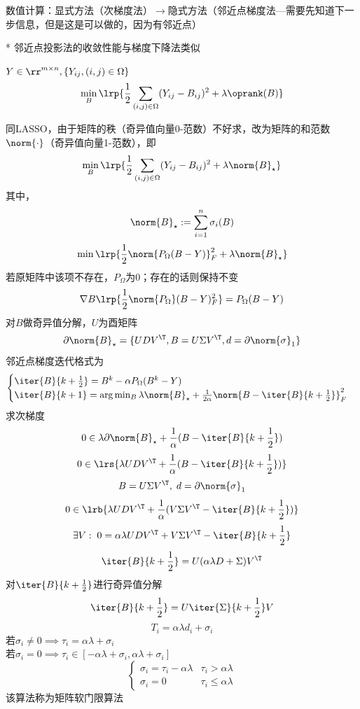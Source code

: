 数值计算：显式方法（次梯度法）$\to$隐式方法（邻近点梯度法---需要先知道下一步信息，但是这是可以做的，因为有邻近点）

* 邻近点投影法的收敛性能与梯度下降法类似

\begin{example}[矩阵补全]
    $Y\in\rr^{m\times n},\{Y_{ij},(i,j)\in\Omega\}$
    \[\min_B\lrp{\frac{1}{2}\sum_{(i,j)\in\Omega}(Y_{ij}-B_{ij})^2+\lambda\oprank(B)}\]
\end{example}
\begin{analysis}
    同LASSO，由于矩阵的秩（奇异值向量0-范数）不好求，改为矩阵的和范数$\norm{\cdot}$（奇异值向量1-范数），即
    \[\min_B\lrp{\frac{1}{2}\sum_{(i,j)\in\Omega}(Y_{ij}-B_{ij})^2+\lambda\norm{B}_\star}\]
    其中，
    \[\norm{B}_\star:=\sum_{i=1}^n\sigma_i(B)\]
    \[\min\lrp{\frac{1}{2}\norm{P_\Omega(B-Y)}_F^2+\lambda\norm{B}_\star}\]
    若原矩阵中该项不存在，$P_\Omega$为$0$；存在的话则保持不变
    \[\nabla B\lrp{\frac{1}{2}\norm{P_\Omega}(B-Y)_F^2}=P_\Omega(B-Y)\]
    对$B$做奇异值分解，$U$为酉矩阵
    \[\partial\norm{B}_\star=\{UDV^\T, B=U\Sigma V^\T, d=\partial\norm{\sigma}_1\}\]
    邻近点梯度迭代格式为
    \[\begin{cases}
        \iter{B}{k+\frac{1}{2}}=B^k-\alpha P_\Omega(B^k-Y)\\
        \iter{B}{k+1}=\arg\min_B\lambda\norm{B}_\star+\frac{1}{2\alpha}\norm{B-\iter{B}{k+\frac{1}{2}}}_F^2
    \end{cases}\]
    求次梯度
    \[0\in\lambda\partial\norm{B}_\star+\frac{1}{\alpha}(B-\iter{B}{k+\frac{1}{2}})\]
    \[0\in\lrs{\lambda UDV^\T+\frac{1}{\alpha}(B-\iter{B}{k+\frac{1}{2}})}\]
    \[B=U\Sigma V^\T,\;d=\partial\norm{\sigma}_1\]
    \[0\in\lrb{\lambda UDV^\T +\frac{1}{\alpha}(V\Sigma V^\T-\iter{B}{k+\frac{1}{2}})}\]
    \[\exists V:\;0=\alpha\lambda UDV^\T+V\Sigma V^\T-\iter{B}{k+\frac{1}{2}}\]
    \[\iter{B}{k+\frac{1}{2}}=U(\alpha\lambda D+\Sigma)V^\T\]
    对$\iter{B}{k+\frac{1}{2}}$进行奇异值分解
    \[\iter{B}{k+\frac{1}{2}}=U\iter{\Sigma}{k+\frac{1}{2}}V\]
    \[T_i=\alpha\lambda d_i+\sigma_i\]
    若$\sigma_i\ne 0\implies \tau_i=\alpha\lambda+\sigma_i$\\
    若$\sigma_i=0\implies \tau_i\in[-\alpha\lambda+\sigma_i,\alpha\lambda+\sigma_i]$\\
    \[\begin{cases}
        \sigma_i=\tau_i-\alpha\lambda & \tau_i>\alpha\lambda\\
        \sigma_i=0 & \tau_i\leq\alpha\lambda
    \end{cases}\]
    该算法称为矩阵软门限算法
\end{analysis}

